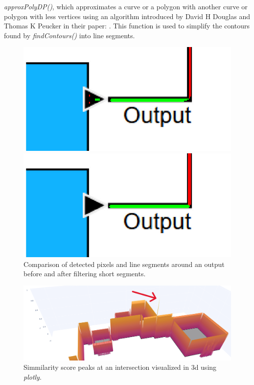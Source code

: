 \textit{approxPolyDP()}, which approximates a curve or a polygon with another curve or polygon with less vertices using an algorithm introduced by David H Douglas and Thomas K Peucker in their paper: \cite{art_approx_Poly_DP_algorithm}. This function is used to simplify the contours found by \textit{findContours()} into line segments.
\begin{figure}[h]
  \centering
  \begin{minipage}[b]{0.45\textwidth}
    \includegraphics[width=\textwidth]{Pictures/thresh_zoom.png}
  \end{minipage}
  \hfill
  \begin{minipage}[b]{0.45\textwidth}
    \includegraphics[width=\textwidth]{Pictures/line_segments_zoom.png}
  \end{minipage}
  \caption{Comparison of detected pixels and line segments around an output before and after filtering short segments.}
  \label{fig_comparison_filter}
\end{figure}
\begin{figure}
    \centering
    \includegraphics[width=1\linewidth]{Pictures/intersection_peak.png}
    \caption{Simmilarity score peaks at an intersection visualized in 3d using \textit{plotly}.}
    \label{fig_intersection_peak}
\end{figure}\\
